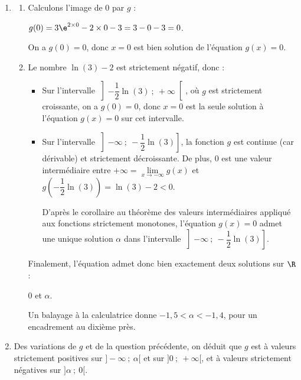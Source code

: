 \begin{enumerate}
\begin{enumerate}

La fonction $g$ admet bien un minimum égal à $\ln (3)-2$, atteint pour $x = -\dfrac{1}{2}\ln(3)$.
	\end{enumerate}
\item 
	\begin{enumerate}
		\item Calculons l'image de 0 par $g$ :

$g(0) = 3\e^{2\times 0} - 2\times 0 - 3 = 3 - 0 - 3 = 0$.

On a $g(0) = 0$, donc $x = 0$ est bien solution de l'équation $g(x)=0$.
		\item Le nombre $\ln (3)-2$ est strictement négatif, donc :

\begin{itemize}
\item Sur l'intervalle $\left]-\dfrac{1}{2}\ln(3)~;~+\infty\right[$, où $g$ est strictement croissante, on a $g(0) = 0$, donc $x=0$ est la seule solution à l'équation $g(x) = 0$ sur cet intervalle.
\item Sur l'intervalle $\left]-\infty~;~ -\dfrac{1}{2}\ln(3) \right]$, la fonction $g$ est continue (car dérivable) et strictement décroissante. De plus, 0 est une valeur intermédiaire entre $+\infty = \lim\limits_{x \to -\infty} g(x)$ et $g\left(-\dfrac{1}{2}\ln(3)\right) = \ln(3) - 2 < 0$.

D'après le corollaire au théorème des valeurs intermédiaires appliqué aux fonctions strictement monotones, l'équation $g(x) = 0$ admet une unique solution $\alpha$ dans l'intervalle $\left]-\infty~;~ -\dfrac{1}{2}\ln(3) \right]$.
\end{itemize}

Finalement, l'équation admet donc bien exactement deux solutions sur $\R$ : 

0 et $\alpha$.

Un balayage à la calculatrice donne $-1,5 <\alpha < -1,4$, pour un encadrement au dixième près.
	\end{enumerate}
\item Des variations de $g$ et de la question précédente, on déduit que $g$ est à valeurs strictement positives sur $]-\infty~;~\alpha[$ et sur $]0~;~+\infty[$, et à valeurs strictement négatives sur $]\alpha~;~0[$.
	\end{enumerate}


